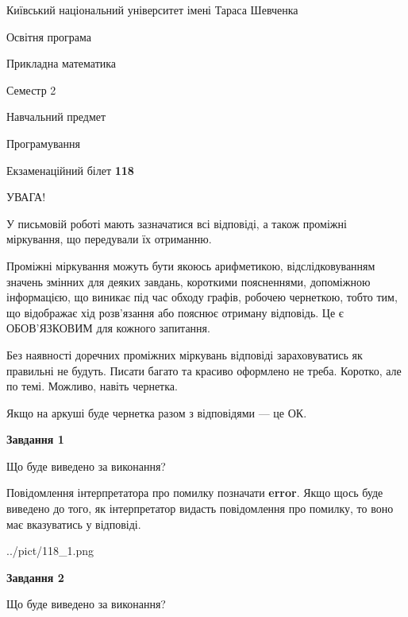 \documentclass[12pt, ukrainian]{article}
\begin{document}
{{\begin {small}\par
{ \center  Київський національний університет імені Тараса Шевченка \par}
{\parbox {5 cm}{Освітня програма \hfill}{\parbox {7 cm}{Прикладна математика \hfill}}\parbox {6 cm}{\hfill Семестр 2}}\par
{\parbox {5 cm} {Навчальний предмет \hfill}\parbox {7 cm}{Програмування \hfill}\parbox {6cm}{\hfill}\par}\vspace{-7pt} \end{small}}{\center Екзаменаційний білет \No \textbf
{ 118 }\par}}
{
\begin {large}
УВАГА!

У письмовій роботі мають зазначатися всі відповіді, а також проміжні міркування, що передували їх отриманню.

Проміжні міркування можуть бути якоюсь арифметикою, відслідковуванням зна\-чень змінних для деяких завдань,
короткими поясненнями, допоміжною інформацією, що виникає під час обходу графів, робочею чернеткою,
тобто тим, що відображає хід розв’язання або пояснює отриману відповідь.
Це є ОБОВ’ЯЗКОВИМ для кожного запитання.

Без наявності доречних проміжних міркувань відповіді зараховуватись як правиль\-ні не будуть.
Писати багато та красиво оформлено не треба. Коротко, але по темі. Можли\-во, навіть чернетка.

Якщо на аркуші буде чернетка разом з відповідями --- це ОК.

\newpage

{\begin {center}\textbf{Завдання 1}\end {center}}\par
Що буде виведено за виконання?

Повідомлення інтерпретатора про помилку позначати \textbf{error}.
Якщо щось буде виведено до того, як інтерпретатор видасть повідомлення про помилку, 
то воно має вказуватись у відповіді. \par


\begin{center}
	{../pict/118_1.png}
\end{center}
\newpage

{\begin {center}\textbf{Завдання 2}\end {center}}\par
Що буде виведено за виконання?


\end{large}}
\end{document}
